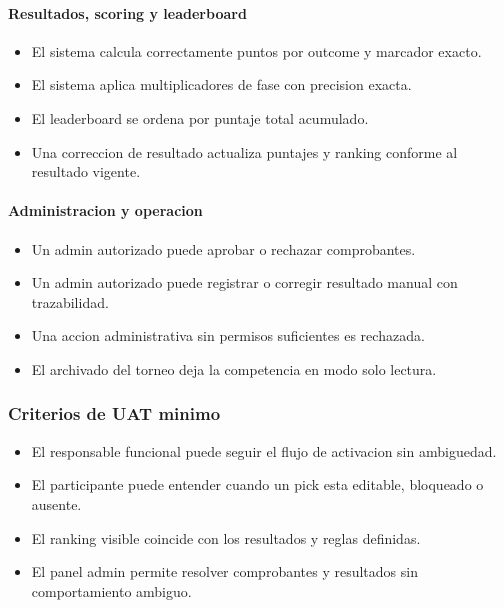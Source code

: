 \paragraph{Resultados, scoring y leaderboard}

\begin{itemize}
  \item El sistema calcula correctamente puntos por outcome y marcador exacto.
  \item El sistema aplica multiplicadores de fase con precision exacta.
  \item El leaderboard se ordena por puntaje total acumulado.
  \item Una correccion de resultado actualiza puntajes y ranking conforme al resultado vigente.
\end{itemize}

\paragraph{Administracion y operacion}

\begin{itemize}
  \item Un admin autorizado puede aprobar o rechazar comprobantes.
  \item Un admin autorizado puede registrar o corregir resultado manual con trazabilidad.
  \item Una accion administrativa sin permisos suficientes es rechazada.
  \item El archivado del torneo deja la competencia en modo solo lectura.
\end{itemize}

\subsubsection{Criterios de UAT minimo}

\begin{itemize}
  \item El responsable funcional puede seguir el flujo de activacion sin ambiguedad.
  \item El participante puede entender cuando un pick esta editable, bloqueado o ausente.
  \item El ranking visible coincide con los resultados y reglas definidas.
  \item El panel admin permite resolver comprobantes y resultados sin comportamiento ambiguo.
\end{itemize}

